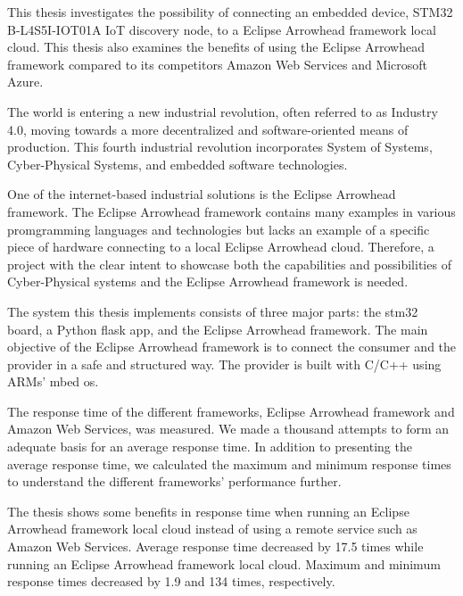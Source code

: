 This thesis investigates the possibility of connecting an embedded device, STM32 B-L4S5I-IOT01A IoT discovery node, to a Eclipse Arrowhead framework local cloud.
This thesis also examines the benefits of using the Eclipse Arrowhead framework compared to its competitors Amazon Web Services and Microsoft Azure.

The world is entering a new industrial revolution, often referred to as Industry 4.0, moving towards a more decentralized and software-oriented means of production.
This fourth industrial revolution incorporates System of Systems, Cyber-Physical Systems, and embedded software technologies.

One of the internet-based industrial solutions is the Eclipse Arrowhead framework. 
The Eclipse Arrowhead framework contains many examples in various promgramming languages and technologies but lacks an example of a specific piece of hardware connecting to a local Eclipse Arrowhead cloud.
Therefore, a project with the clear intent to showcase both the capabilities and possibilities of Cyber-Physical systems and the Eclipse Arrowhead framework is needed.

The system this thesis implements consists of three major parts: the stm32 board, a Python flask app, and the Eclipse Arrowhead framework.
The main objective of the Eclipse Arrowhead framework is to connect the consumer and the provider in a safe and structured way.
The provider is built with C/C++ using ARMs' mbed os. 

The response time of the different frameworks, Eclipse Arrowhead framework and Amazon Web Services, was measured.
We made a thousand attempts to form an adequate basis for an average response time. 
In addition to presenting the average response time, we calculated the maximum and minimum response times to understand the different frameworks' performance further. 

The thesis shows some benefits in response time when running an Eclipse Arrowhead framework local cloud instead of using a remote service such as Amazon Web Services. 
Average response time decreased by 17.5 times while running an Eclipse Arrowhead framework local cloud.
Maximum and minimum response times decreased by 1.9 and 134 times, respectively.  